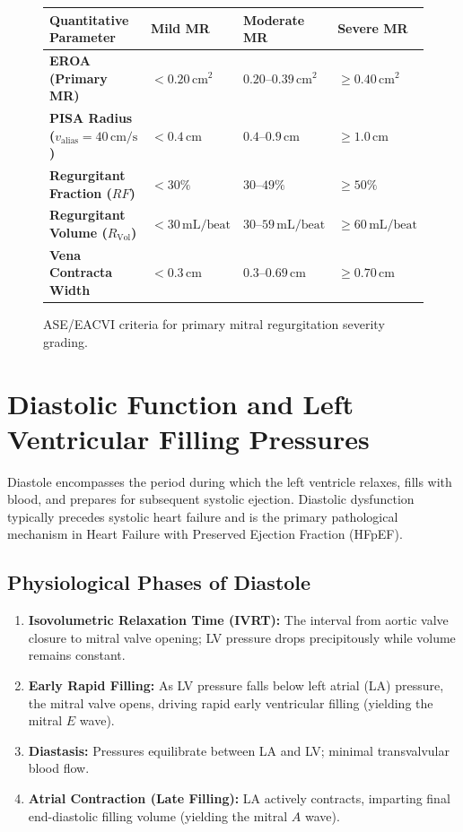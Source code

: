 \documentclass[11pt,a4paper]{article}
\begin{document}
\begin{figure}[htbp]
\centering
\setlength{\tabcolsep}{4pt}
\begin{tabular}{p{4.2cm}p{3.2cm}p{3.4cm}p{3.6cm}}
\toprule
\textbf{Quantitative Parameter} & \textbf{Mild MR} & \textbf{Moderate MR} & \textbf{Severe MR} \\
\midrule
\textbf{EROA (Primary MR)} & $< 0.20\,\text{cm}^2$ & $0.20\text{--}0.39\,\text{cm}^2$ & $\ge 0.40\,\text{cm}^2$ \\
\textbf{PISA Radius ($v_{\text{alias}} = 40\,\text{cm/s}$)} & $< 0.4\,\text{cm}$ & $0.4\text{--}0.9\,\text{cm}$ & $\ge 1.0\,\text{cm}$ \\
\textbf{Regurgitant Fraction ($RF$)} & $< 30\%$ & $30\text{--}49\%$ & $\ge 50\%$ \\
\textbf{Regurgitant Volume ($R_{\text{Vol}}$)} & $< 30\,\text{mL/beat}$ & $30\text{--}59\,\text{mL/beat}$ & $\ge 60\,\text{mL/beat}$ \\
\textbf{Vena Contracta Width} & $< 0.3\,\text{cm}$ & $0.3\text{--}0.69\,\text{cm}$ & $\ge 0.70\,\text{cm}$ \\
\bottomrule
\end{tabular}
\caption{ASE/EACVI criteria for primary mitral regurgitation severity grading.}
\label{tab:mr_staging}
\end{figure}

\newpage
\section{Diastolic Function and Left Ventricular Filling Pressures}

Diastole encompasses the period during which the left ventricle relaxes, fills with blood, and prepares for subsequent systolic ejection. Diastolic dysfunction typically precedes systolic heart failure and is the primary pathological mechanism in Heart Failure with Preserved Ejection Fraction (HFpEF).

\subsection{Physiological Phases of Diastole}
\begin{enumerate}[leftmargin=*]
    \item \textbf{Isovolumetric Relaxation Time (IVRT):} The interval from aortic valve closure to mitral valve opening; LV pressure drops precipitously while volume remains constant.
    \item \textbf{Early Rapid Filling:} As LV pressure falls below left atrial (LA) pressure, the mitral valve opens, driving rapid early ventricular filling (yielding the mitral $E$ wave).
    \item \textbf{Diastasis:} Pressures equilibrate between LA and LV; minimal transvalvular blood flow.
    \item \textbf{Atrial Contraction (Late Filling):} LA actively contracts, imparting final end-diastolic filling volume (yielding the mitral $A$ wave).
\end{enumerate}
\end{document}
